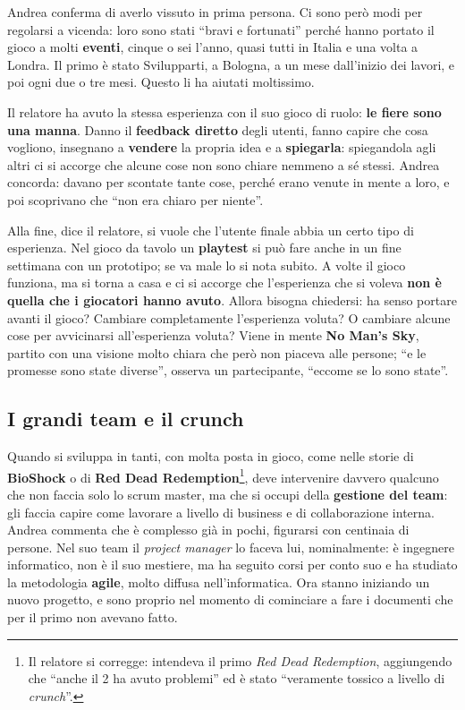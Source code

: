 Andrea conferma di averlo vissuto in prima persona. Ci sono però modi per
regolarsi a vicenda: loro sono stati ``bravi e fortunati'' perché hanno portato
il gioco a molti \textbf{eventi}, cinque o sei l'anno, quasi tutti in Italia e una
volta a Londra. Il primo è stato Svilupparti, a Bologna, a un mese dall'inizio dei
lavori, e poi ogni due o tre mesi. Questo li ha aiutati moltissimo.

Il relatore ha avuto la stessa esperienza con il suo gioco di ruolo: \textbf{le
fiere sono una manna}. Danno il \textbf{feedback diretto} degli utenti, fanno
capire che cosa vogliono, insegnano a \textbf{vendere} la propria idea e a
\textbf{spiegarla}: spiegandola agli altri ci si accorge che alcune cose non sono
chiare nemmeno a sé stessi. Andrea concorda: davano per scontate tante cose,
perché erano venute in mente a loro, e poi scoprivano che ``non era chiaro per
niente''.

Alla fine, dice il relatore, si vuole che l'utente finale abbia un certo tipo di
esperienza. Nel gioco da tavolo un \textbf{playtest} si può fare anche in un fine
settimana con un prototipo; se va male lo si nota subito. A volte il gioco
funziona, ma si torna a casa e ci si accorge che l'esperienza che si voleva
\textbf{non è quella che i giocatori hanno avuto}. Allora bisogna chiedersi: ha
senso portare avanti il gioco? Cambiare completamente l'esperienza voluta? O
cambiare alcune cose per avvicinarsi all'esperienza voluta? Viene in mente
\textbf{No Man's Sky}, partito con una visione molto chiara che però non piaceva
alle persone; ``e le promesse sono state diverse'', osserva un partecipante,
``eccome se lo sono state''.

\subsection{I grandi team e il crunch}

Quando si sviluppa in tanti, con molta posta in gioco, come nelle storie di
\textbf{BioShock} o di \textbf{Red Dead Redemption}\footnote{Il relatore si
corregge: intendeva il primo \emph{Red Dead Redemption}, aggiungendo che ``anche
il 2 ha avuto problemi'' ed è stato ``veramente tossico a livello di
\emph{crunch}''.}, deve intervenire davvero qualcuno che non faccia solo lo scrum
master, ma che si occupi della \textbf{gestione del team}: gli faccia capire come
lavorare a livello di business e di collaborazione interna. Andrea commenta che è
complesso già in pochi, figurarsi con centinaia di persone. Nel suo team il
\emph{project manager} lo faceva lui, nominalmente: è ingegnere informatico, non
è il suo mestiere, ma ha seguito corsi per conto suo e ha studiato la metodologia
\textbf{agile}, molto diffusa nell'informatica. Ora stanno iniziando un nuovo
progetto, e sono proprio nel momento di cominciare a fare i documenti che per il
primo non avevano fatto.

